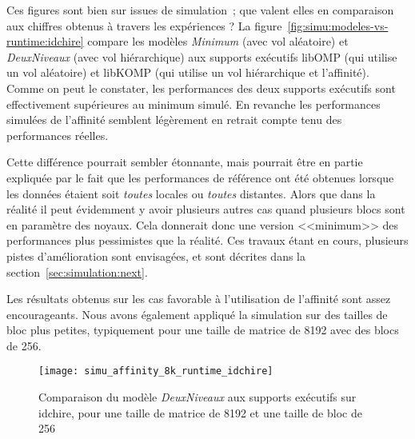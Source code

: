Ces figures sont bien sur issues de simulation~; que valent elles en comparaison aux chiffres obtenus à travers les expériences ?
La figure~\ref{fig:simu:modeles-vs-runtime:idchire} compare les modèles \emph{Minimum} (avec vol aléatoire) et \emph{DeuxNiveaux} (avec vol hiérarchique) aux supports exécutifs libOMP (qui utilise un vol aléatoire) et libKOMP (qui utilise un vol hiérarchique et l'affinité).
Comme on peut le constater, les performances des deux supports exécutifs sont effectivement supérieures au minimum simulé. En revanche les performances simulées de l'affinité semblent légèrement en retrait compte tenu des performances réelles.

Cette différence pourrait sembler étonnante, mais pourrait être en partie expliquée par le fait que les performances de référence ont été obtenues lorsque les données étaient soit \textit{toutes} locales ou \textit{toutes} distantes.
Alors que dans la réalité il peut évidemment y avoir plusieurs autres cas quand plusieurs blocs sont en paramètre des noyaux.
Cela donnerait donc une version <<minimum>> des performances plus pessimistes que la réalité.
Ces travaux étant en cours, plusieurs pistes d'amélioration sont envisagées, et sont décrites dans la section~\ref{sec:simulation:next}.





Les résultats obtenus sur les cas favorable à l'utilisation de l'affinité sont assez encourageants.
Nous avons également appliqué la simulation sur des tailles de bloc plus petites, typiquement pour une taille de matrice de 8192 avec des blocs de 256.

\begin{figure}[h!]
  \centering
  \texttt{[image: simu\_affinity\_8k\_runtime\_idchire]}
  \caption{Comparaison du modèle \emph{DeuxNiveaux} aux supports exécutifs sur idchire, pour une taille de matrice de 8192 et une taille de bloc de 256}\label{fig:simu:affinityavg-8k-vs-runtime:idchire}
\end{figure}



